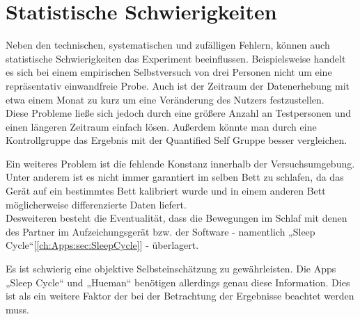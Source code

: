\section{Statistische Schwierigkeiten}
\label{ch:Relativierung:sec:StatistischeSchwierigkeiten}

Neben den technischen, systematischen und zufälligen Fehlern, können auch statistische Schwierigkeiten das Experiment beeinflussen.
Beispielsweise handelt es sich bei einem empirischen Selbstversuch von drei Personen nicht um eine repräsentativ einwandfreie Probe.
Auch ist der Zeitraum der Datenerhebung mit etwa einem Monat zu kurz um eine Veränderung des Nutzers festzustellen. \\
Diese Probleme ließe sich jedoch durch eine größere Anzahl an Testpersonen und einen längeren Zeitraum einfach lösen.
Außerdem könnte man durch eine Kontrollgruppe das Ergebnis mit der Quantified Self Gruppe besser vergleichen. 

Ein weiteres Problem ist die fehlende Konstanz innerhalb der Versuchsumgebung.
Unter anderem ist es nicht immer garantiert im selben Bett zu schlafen, da das Gerät auf ein bestimmtes Bett kalibriert wurde und in einem anderen Bett möglicherweise differenzierte Daten liefert.\\
Desweiteren besteht die Eventualität, dass die Bewegungen im Schlaf mit denen des Partner im Aufzeichungsgerät bzw. der Software - namentlich „Sleep Cycle“[\ref{ch:Apps:sec:SleepCycle}] - überlagert.

Es ist schwierig eine objektive Selbsteinschätzung zu gewährleisten. Die Apps „Sleep Cycle“ und „Hueman“ benötigen allerdings genau diese Information.
Dies ist als ein weitere Faktor der bei der Betrachtung der Ergebnisse beachtet werden muss.








